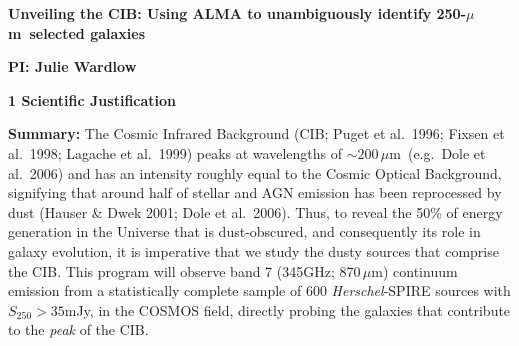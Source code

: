 \documentclass[12pt,a4paper]{article}
\newcommand{\herschel}{{\it Herschel}}
\newcommand{\micron}{$\mu$m}
\begin{document}
\pagestyle{plain}
 

\begin{center}
{\LARGE{\bf
{Unveiling the CIB: Using ALMA to unambiguously identify 250-\micron\
  selected galaxies}
}}
\end{center}

\centerline{\bf PI: 
{Julie Wardlow}}



{\large{\bf1 Scientific Justification}}

{\bf Summary: }
%
The Cosmic Infrared Background (CIB; Puget et al.\ 1996; Fixsen et
al.\ 1998; Lagache et al.\ 1999) peaks at wavelengths of
$\sim200$\,\micron\ (e.g.\ Dole et al.\ 2006) and has an intensity roughly equal to the
Cosmic Optical Background, signifying that around half of stellar
and AGN emission has been
reprocessed by dust (Hauser \& Dwek 2001; Dole et al.\ 2006). Thus, to
reveal the 50\% of energy generation in the Universe that is dust-obscured, and consequently
its role in galaxy evolution, it is imperative that we study the dusty
sources that comprise the CIB.
%
This program will observe band 7 (345GHz; 870\,\micron) continuum
emission from a statistically complete sample of
600 \herschel-SPIRE sources with $S_{250}>35$mJy, in the COSMOS field, directly probing the galaxies that
contribute to the {\it peak} of the CIB. 
\end{document}

